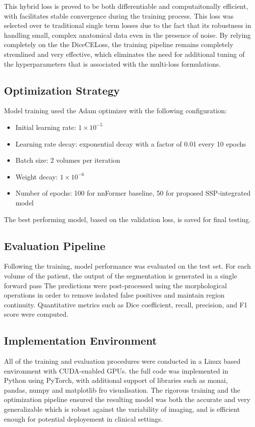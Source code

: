 This hybrid loss is proved to be both differentiable and computaitonally efficient, with facilitates stable convergence during the training process. This loss was selected over te traditional single term losses due to the fact that its robustness in handling small, complex anatomical data even in the presence of noise. By relying completely on the the DiceCELoss, the training pipeline remains completely stremlined and very effective, which eliminates the need for additional tuning of the hyperparameters that is associated with the multi-loss formulations.

\subsection{Optimization Strategy}
Model training used the Adam optimizer \cite{Kingma2015Adam} with the following configuration:

\begin{itemize} \item Initial learning rate: $1 \times 10^{-5}$ \item Learning rate decay: exponential decay with a factor of 0.01 every 10 epochs \item Batch size: 2 volumes per iteration \item Weight decay: $1 \times 10^{-6}$ \item Number of epochs: 100 for nnFormer baseline, 50 for proposed SSP-integrated model \end{itemize}

The best performing model, based on the validation loss, is saved for final testing.

\subsection{Evaluation Pipeline}
Following the training, model performance was evaluated on the test set. For each volume of the patient, the output of the segmentation is generated in a single forward pass The predictions were post-processed using the morphological operations in order to remove isolated false positives and maintain region continuity. Quantitative metrics such as Dice coefficient, recall, precision, and F1 score were computed.

\subsection{Implementation Environment}
All of the training and evaluation procedures were conducted in a Linux based environment with CUDA-enabled GPUs. the full code was implemented in Python using PyTorch, with additional support of libraries such as monai, pandas, numpy and matplotlib fro visualisation. The rigorous training and the optimization pipeline ensured the resulting model was both the accurate and very generalizable which is robust against the variability of imaging, and is efficient enough for potential deployement in clinical settings.

